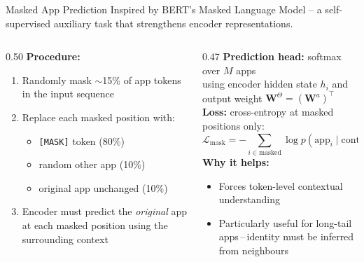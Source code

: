 \documentclass[aspectratio=169,t]{beamer}
\begin{document}
\begin{frame}[shrink=10]{Masked App Prediction}
  Inspired by BERT's Masked Language Model -- a self-supervised auxiliary task that strengthens encoder representations.
  \vspace{0.25cm}
  \begin{columns}[T]
    \begin{column}{0.50\textwidth}
      \textbf{Procedure:}
      \begin{enumerate}
        \item Randomly mask $\sim$15\% of app tokens in the input sequence
        \item Replace each masked position with:
          \begin{itemize}
            \item \texttt{[MASK]} token \hfill(80\%)
            \item random other app \hfill(10\%)
            \item original app unchanged \hfill(10\%)
          \end{itemize}
        \item Encoder must predict the \emph{original} app at each masked position using the surrounding context
      \end{enumerate}
    \end{column}
    \begin{column}{0.47\textwidth}
      \textbf{Prediction head:} softmax over $M$ apps\\
      using encoder hidden state $h_i$ and output weight $\mathbf{W}^\Theta = (\mathbf{W}^a)^\top$\\[0.3cm]
      \textbf{Loss:} cross-entropy at masked positions only:
      \[
        \mathcal{L}_\text{mask} = -\sum_{i \in \text{masked}} \log p(\text{app}_i \mid \text{context})
      \]
      \vspace{0.1cm}
      \textbf{Why it helps:}
      \begin{itemize}
        \item Forces token-level contextual understanding
        \item Particularly useful for long-tail apps\,--\,identity must be inferred from neighbours
      \end{itemize}
    \end{column}
  \end{columns}
\end{frame}
\end{document}
